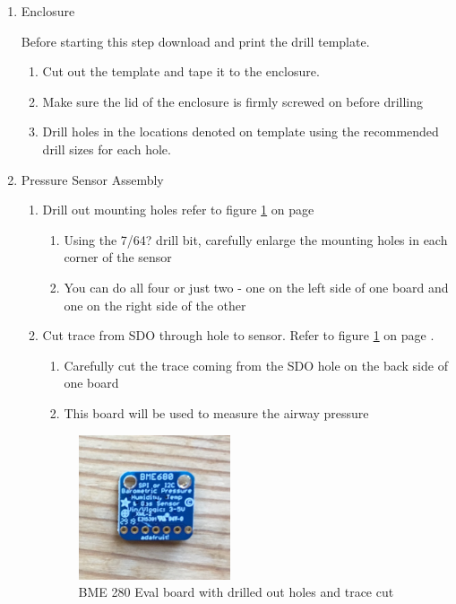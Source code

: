 \documentclass[11pt, letterpaper]{article}
\begin{document}
\begin{enumerate}
\item
Enclosure

Before starting this step download and print the drill template. 

\begin{enumerate}[label=2.\arabic*]
\item
Cut out the template and tape it to the enclosure.
\item
Make sure the lid of the enclosure is firmly screwed on before drilling
\item
Drill holes in the locations denoted on template using the recommended drill sizes for each hole. 
\end{enumerate}

\item
Pressure Sensor Assembly
\begin{enumerate}[label=3.\arabic*]
\item
Drill out mounting holes refer to figure \ref{fig:bme_1} on page \pageref{fig:bme_1}
\begin{enumerate}[label=3.1.\arabic*]
\item
Using the 7/64? drill bit, carefully enlarge the mounting holes in each corner of the sensor
\item
You can do all four or just two - one on the left side of one board and one on the right side of the other
\end{enumerate}
\item
Cut trace from SDO through hole to sensor. Refer to figure \ref{fig:bme_1} on page \pageref{fig:bme_1}.
\begin{enumerate}[label=3.2.\arabic*]
\item
Carefully cut the trace coming from the SDO hole on the back side of one board
\item
This board will be used to measure the airway pressure
\end{enumerate}
\begin{figure}[H]
\centering
\includegraphics[width=0.45\textwidth]{images/bme_1.JPG}
\caption{BME 280 Eval board with drilled out holes and trace cut} 
\label{fig:bme_1}
\end{figure}


\end{enumerate}
\end{enumerate}
\end{document}
